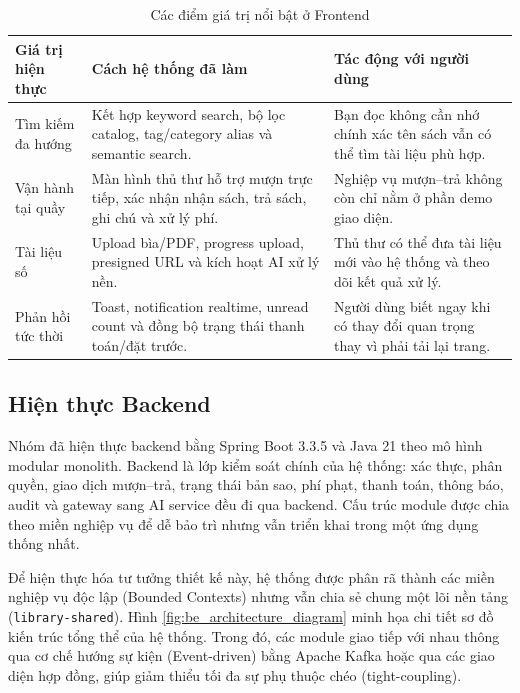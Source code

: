 \begin{table}[H]
\centering
\small
\begin{tabularx}{\textwidth}{|p{3.4cm}|X|p{3.4cm}|}
\hline
\textbf{Giá trị hiện thực} & \textbf{Cách hệ thống đã làm} & \textbf{Tác động với người dùng} \\
\hline
Tìm kiếm đa hướng &
Kết hợp keyword search, bộ lọc catalog, tag/category alias và semantic search. &
Bạn đọc không cần nhớ chính xác tên sách vẫn có thể tìm tài liệu phù hợp. \\
\hline
Vận hành tại quầy &
Màn hình thủ thư hỗ trợ mượn trực tiếp, xác nhận nhận sách, trả sách, ghi chú và xử lý phí. &
Nghiệp vụ mượn--trả không còn chỉ nằm ở phần demo giao diện. \\
\hline
Tài liệu số &
Upload bìa/PDF, progress upload, presigned URL và kích hoạt AI xử lý nền. &
Thủ thư có thể đưa tài liệu mới vào hệ thống và theo dõi kết quả xử lý. \\
\hline
Phản hồi tức thời &
Toast, notification realtime, unread count và đồng bộ trạng thái thanh toán/đặt trước. &
Người dùng biết ngay khi có thay đổi quan trọng thay vì phải tải lại trang. \\
\hline
\end{tabularx}
\caption{Các điểm giá trị nổi bật ở Frontend}
\label{tab:fe_value_highlights}
\end{table}

\subsection{Hiện thực Backend}

Nhóm đã hiện thực backend bằng Spring Boot 3.3.5 và Java 21 theo mô hình modular
monolith. Backend là lớp kiểm soát chính của hệ thống: xác thực, phân quyền,
giao dịch mượn--trả, trạng thái bản sao, phí phạt, thanh toán, thông báo, audit
và gateway sang AI service đều đi qua backend. Cấu trúc module được chia theo
miền nghiệp vụ để dễ bảo trì nhưng vẫn triển khai trong một ứng dụng thống nhất.


Để hiện thực hóa tư tưởng thiết kế này, hệ thống được phân rã thành các miền nghiệp vụ độc lập (Bounded Contexts) nhưng vẫn chia sẻ chung một lõi nền tảng (\texttt{library-shared}). Hình \ref{fig:be_architecture_diagram} minh họa chi tiết sơ đồ kiến trúc tổng thể của hệ thống. Trong đó, các module giao tiếp với nhau thông qua cơ chế hướng sự kiện (Event-driven) bằng Apache Kafka hoặc qua các giao diện hợp đồng, giúp giảm thiểu tối đa sự phụ thuộc chéo (tight-coupling).

